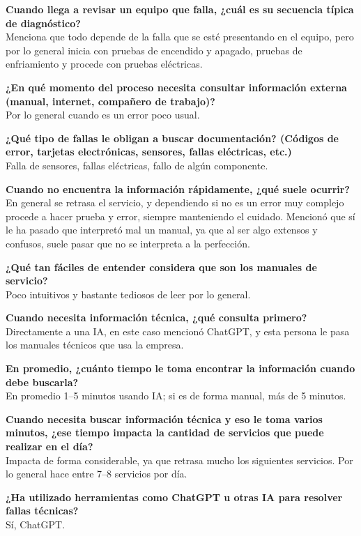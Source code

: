 {{    \textbf{Cuando llega a revisar un equipo que falla, ¿cuál es su secuencia típica de diagnóstico?}\\
    Menciona que todo depende de la falla que se esté presentando en el equipo, pero por lo general inicia con pruebas de encendido y apagado, pruebas de enfriamiento y procede con pruebas eléctricas.

    \textbf{¿En qué momento del proceso necesita consultar información externa (manual, internet, compañero de trabajo)?}\\
    Por lo general cuando es un error poco usual.

    \textbf{¿Qué tipo de fallas le obligan a buscar documentación? (Códigos de error, tarjetas electrónicas, sensores, fallas eléctricas, etc.)}\\
    Falla de sensores, fallas eléctricas, fallo de algún componente.

    \textbf{Cuando no encuentra la información rápidamente, ¿qué suele ocurrir?}\\
    En general se retrasa el servicio, y dependiendo si no es un error muy complejo procede a hacer prueba y error, siempre manteniendo el cuidado. Mencionó que sí le ha pasado que interpretó mal un manual, ya que al ser algo extensos y confusos, suele pasar que no se interpreta a la perfección.

    \textbf{¿Qué tan fáciles de entender considera que son los manuales de servicio?}\\
    Poco intuitivos y bastante tediosos de leer por lo general.

    \textbf{Cuando necesita información técnica, ¿qué consulta primero?}\\
    Directamente a una IA, en este caso mencionó ChatGPT, y esta persona le pasa los manuales técnicos que usa la empresa.

    \textbf{En promedio, ¿cuánto tiempo le toma encontrar la información cuando debe buscarla?}\\
    En promedio 1--5 minutos usando IA; si es de forma manual, más de 5 minutos.

    \textbf{Cuando necesita buscar información técnica y eso le toma varios minutos, ¿ese tiempo impacta la cantidad de servicios que puede realizar en el día?}\\
    Impacta de forma considerable, ya que retrasa mucho los siguientes servicios. Por lo general hace entre 7--8 servicios por día.

    \textbf{¿Ha utilizado herramientas como ChatGPT u otras IA para resolver fallas técnicas?}\\
    Sí, ChatGPT.

}}
